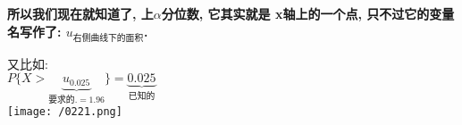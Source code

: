 \documentclass[UTF8]{ctexart}
\begin{document}
	\textbf{所以我们现在就知道了, 上$\alpha$分位数, 它其实就是 x轴上的一个点, 只不过它的变量名写作了: $u_{\text{右侧曲线下的面积}}$.} \\
	
	
	\begin{myEnvSample}
又比如: \\
$P\{X>\underset{\text{要求的}.=1.96}{\underbrace{u_{0.025}}}\}=\underset{\text{已知的}}{\underbrace{0.025}}$ \\
	\texttt{[image: /0221.png]} 
	\end{myEnvSample}
	
	
	
\end{document}
